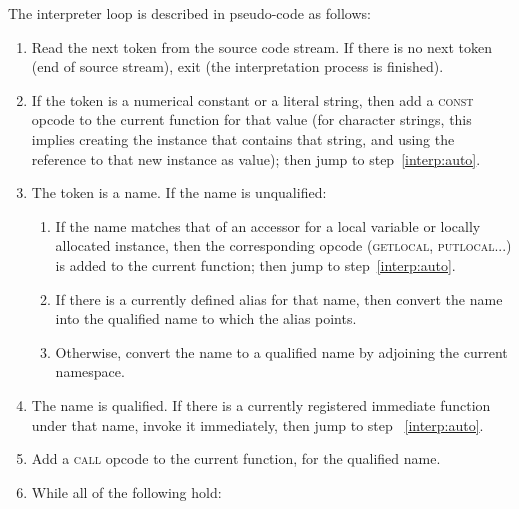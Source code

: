 The interpreter loop is described in pseudo-code as follows:
\begin{enumerate}

    \item \label{interp:start}Read the next token from the source code
    stream. If there is no next token (end of source stream), exit (the
    interpretation process is finished).

    \item \label{interp:const}If the token is a numerical constant or a
    literal string, then add a \textsc{const} opcode to the current
    function for that value (for character strings, this implies
    creating the instance that contains that string, and using the
    reference to that new instance as value); then jump to
    step~\ref{interp:auto}.

    \item \label{interp:name}The token is a name. If the name is
    unqualified:
    \begin{enumerate}

        \item If the name matches that of an accessor for a local
        variable or locally allocated instance, then the corresponding
        opcode (\textsc{getlocal}, \textsc{putlocal}...) is added to the
        current function; then jump to step~\ref{interp:auto}.

        \item If there is a currently defined alias for that name,
        then convert the name into the qualified name to which the
        alias points.

        \item Otherwise, convert the name to a qualified name by
        adjoining the current namespace.

    \end{enumerate}

    \item \label{interp:immediate}The name is qualified. If there
    is a currently registered immediate function under that name,
    invoke it immediately, then jump to step ~\ref{interp:auto}.

    \item \label{interp:call}Add a \textsc{call} opcode to the
    current function, for the qualified name.

    \item \label{interp:auto}While all of the following hold:
    \begin{itemize}


\end{itemize}
\end{enumerate}
